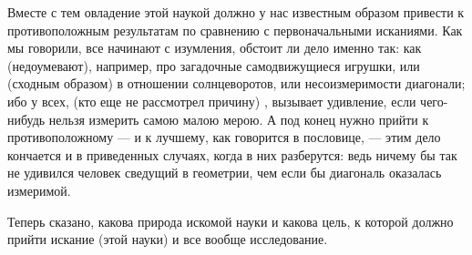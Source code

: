 \documentclass{article}
\begin{document}
Вместе с тем овладение этой наукой должно у нас известным образом привести к противоположным результатам по сравнению с первоначальными исканиями. Как мы говорили, все начинают с изумления, обстоит ли дело именно так: как (недоумевают), например, про загадочные самодвижущиеся игрушки, или (сходным образом) в отношении солнцеворотов, или несоизмеримости диагонали; ибо у всех, (кто еще не рассмотрел причину)
\footnotemark[12]
, вызывает удивление, если чего-нибудь нельзя измерить самою малою мерою. А под конец нужно прийти к противоположному — и к лучшему, как говорится в пословице, — этим дело кончается и в приведенных случаях, когда в них разберутся: ведь ничему бы так не удивился человек сведущий в геометрии, чем если бы диагональ оказалась измеримой.

Теперь сказано, какова природа искомой науки и какова цель, к которой должно прийти искание (этой науки) и все вообще исследование.
\end{document}
